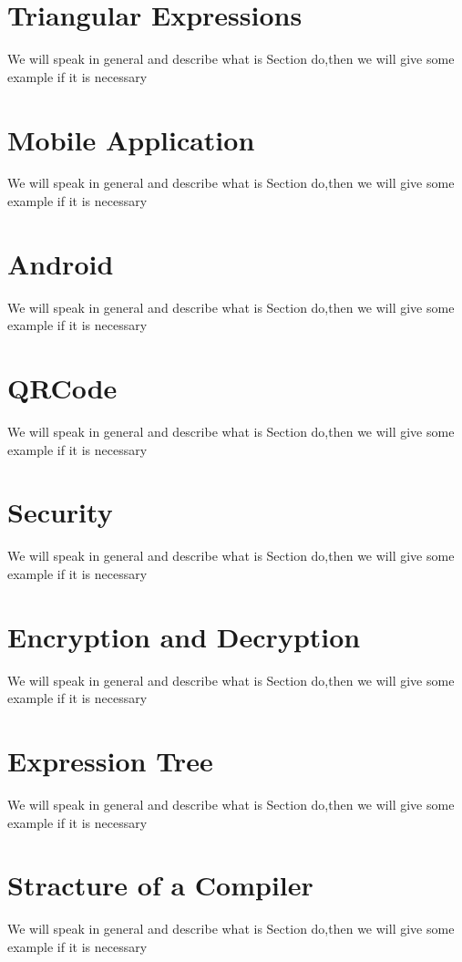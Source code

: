 \section{Triangular Expressions}
We will speak in general and describe what is Section do,then we will give some example if it is necessary

\section{Mobile Application}
We will speak in general and describe what is Section do,then we will give some example if it is necessary

\section{Android}
We will speak in general and describe what is Section do,then we will give some example if it is necessary

\section{QRCode}
We will speak in general and describe what is Section do,then we will give some example if it is necessary

\section{Security}
We will speak in general and describe what is Section do,then we will give some example if it is necessary


\section{Encryption and Decryption}
We will speak in general and describe what is Section do,then we will give some example if it is necessary

\section{Expression Tree}
We will speak in general and describe what is Section do,then we will give some example if it is necessary


\section{Stracture of a Compiler}
We will speak in general and describe what is Section do,then we will give some example if it is necessary


